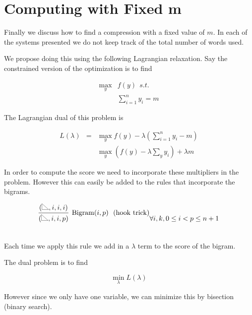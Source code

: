 \documentclass{article}
\begin{document}

\pagebreak 

\section{Computing with Fixed m}


Finally we discuss how to find a compression with a fixed value of $m$. In each of the systems presented we do not keep track of the total number of words used. 

We propose doing this using the following Lagrangian relaxation. Say the constrained version of the optimization is to find 

\begin{eqnarray*}
  \max_y & f(y) \ \  s.t.  \\
  & \displaystyle \sum_{i=1}^n y_{i} = m
\end{eqnarray*}


The Lagrangian dual of this problem is 

\begin{eqnarray*}
L(\lambda)  &=& \max_y f(y)  - \lambda (\sum_{i=1}^n y_i - m) \\
&& \max_y (f(y) - \lambda \sum_y y_i) + \lambda m
\end{eqnarray*}


In order to compute the score we need to incorporate these multipliers in the problem. However this can easily be added to the rules that incorporate the bigrams.

\begin{eqnarray*}
\infer[\mathrm{Bigram}(i,p) \ \ \mathrm{(hook\ trick)}]{(\rtri, i,i, p)}{(\rtri, i, i,i)} &  \forall i,k,  0 \leq i < p \leq n + 1\\\\
\end{eqnarray*}
 
Each time we apply this rule we add in a $\lambda$ term to the score of the bigram. 

The dual problem is to find 

\[ \min_{\lambda} L(\lambda) \]

However since we only have one variable, we can minimize this by bisection (binary search).


 

\end{document}
